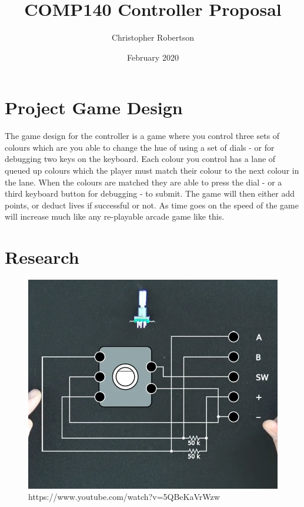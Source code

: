 \documentclass{article}
\title{COMP140 Controller Proposal}
\author{Christopher Robertson}
\date{February 2020}
\begin{document}
\maketitle
\newpage

\section{Project Game Design}

The game design for the controller is a game where you control three sets of colours which are you able to change the hue of using a set of dials - or for debugging two keys on the keyboard. Each colour you control has a lane of queued up colours which the player must match their colour to the next colour in the lane. When the colours are matched they are able to press the dial - or a third keyboard button for debugging - to submit. The game will then either add points, or deduct lives if successful or not. As time goes on the speed of the game will increase much like any re-playable arcade game like this.

\section{Research}

\begin{figure}[ht]
  \includegraphics[width=\textwidth,height=\textheight,keepaspectratio]{rotary_encoder.PNG}
  \caption{https://www.youtube.com/watch?v=5QBeKaVrWzw}
  \label{fig:rotary_encoder}
\end{figure}
\end{document}
